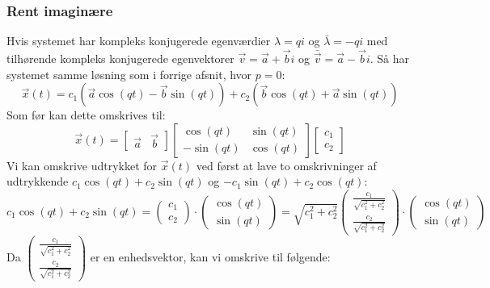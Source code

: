 \subsubsection{Rent imaginære}
Hvis systemet har kompleks konjugerede egenværdier $\lambda=qi$ og $\bar{\lambda}=-qi$ med tilhørende kompleks konjugerede egenvektorer $\vec{v}=\vec{a}+\vec{b}i$ og $\bar{\vec{v}}=\vec{a}-\vec{b}i$. Så har systemet samme løsning som i forrige afsnit, hvor $p=0$:
\begin{equation*}
    \vec{x}(t)=c_1(\vec{a}\cos(qt)-\vec{b}\sin(qt))+c_2(\vec{b}\cos(qt)+\vec{a}\sin(qt))
\end{equation*}
Som før kan dette omskrives til:
\begin{equation*}
    \vec{x}(t)=\begin{bmatrix}
        \vec{a} & \vec{b}
    \end{bmatrix} \begin{bmatrix}
        \cos(qt) & \sin(qt) \\
        -\sin(qt) & \cos(qt)
    \end{bmatrix} \begin{bmatrix}
        c_1\\
        c_2
    \end{bmatrix}
\end{equation*}
Vi kan omskrive udtrykket for $\vec{x}(t)$ ved først at lave to omskrivninger af udtrykkende $c_1\cos(qt)+c_2\sin(qt)$ og $-c_1\sin(qt)+c_2\cos(qt)$:
\begin{equation*}
    c_1\cos(qt)+c_2\sin(qt)=\begin{pmatrix}
        c_1 \\ c_2
    \end{pmatrix} \cdot \begin{pmatrix}
        \cos(qt) \\ \sin(qt) 
    \end{pmatrix}  = \sqrt{c_1^2+c_2^2}\begin{pmatrix}
        \frac{c_1}{\sqrt{c_1^2+c_2^2}}\\ \frac{c_2}{\sqrt{c_1^2+c_2^2}}
    \end{pmatrix} \cdot \begin{pmatrix}
        \cos(qt) \\ \sin(qt) 
    \end{pmatrix}
\end{equation*}
Da $\begin{pmatrix}
        \frac{c_1}{\sqrt{c_1^2+c_2^2}}\\ \frac{c_2}{\sqrt{c_1^2+c_2^2}}
    \end{pmatrix}$ er en enhedsvektor, kan vi omskrive til følgende:
